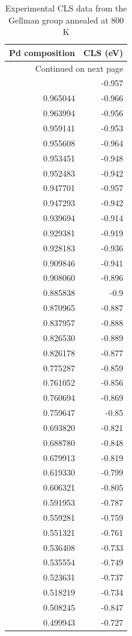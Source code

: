 \documentclass[number, sort&compress, review, 12pt]{elsarticle}
\begin{document}
\begin{longtable}{rr}
\caption{\label{gellman0}Experimental CLS data from the Gellman group annealed at 800 K}
\\
Pd composition & CLS (eV)\\
\hline
\endhead
\hline\multicolumn{2}{r}{Continued on next page} \\
\endfoot
\endlastfoot
0.970620 & -0.957\\
0.965044 & -0.966\\
0.963994 & -0.956\\
0.959141 & -0.953\\
0.955608 & -0.964\\
0.953451 & -0.948\\
0.952483 & -0.942\\
0.947701 & -0.957\\
0.947293 & -0.942\\
0.939694 & -0.914\\
0.929381 & -0.919\\
0.928183 & -0.936\\
0.909846 & -0.941\\
0.908060 & -0.896\\
0.885838 & -0.9\\
0.870965 & -0.887\\
0.837957 & -0.888\\
0.826530 & -0.889\\
0.826178 & -0.877\\
0.775287 & -0.859\\
0.761052 & -0.856\\
0.760694 & -0.869\\
0.759647 & -0.85\\
0.693820 & -0.821\\
0.688780 & -0.848\\
0.679913 & -0.819\\
0.619330 & -0.799\\
0.606321 & -0.805\\
0.591953 & -0.787\\
0.559281 & -0.759\\
0.551321 & -0.761\\
0.536408 & -0.733\\
0.535554 & -0.749\\
0.523631 & -0.737\\
0.518219 & -0.734\\
0.508245 & -0.847\\
0.499943 & -0.727\\

\end{longtable}
\end{document}
